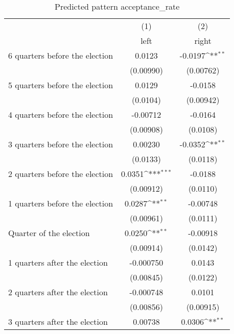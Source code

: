 \begin{table}[htbp]\centering
\def\sym#1{\ifmmode^{#1}\else\(^{#1}\)\fi}
\caption{Predicted pattern acceptance\_rate}
\begin{tabular}{l*{2}{c}}
\hline\hline
                    &\multicolumn{1}{c}{(1)}&\multicolumn{1}{c}{(2)}\\
                    &\multicolumn{1}{c}{left}&\multicolumn{1}{c}{right}\\
\hline
 6 quarters before the election&      0.0123         &     -0.0197\sym{**} \\
                    &   (0.00990)         &   (0.00762)         \\
[1em]
 5 quarters before the election&      0.0129         &     -0.0158         \\
                    &    (0.0104)         &   (0.00942)         \\
[1em]
 4 quarters before the election&    -0.00712         &     -0.0164         \\
                    &   (0.00908)         &    (0.0108)         \\
[1em]
 3 quarters before the election&     0.00230         &     -0.0352\sym{**} \\
                    &    (0.0133)         &    (0.0118)         \\
[1em]
 2 quarters before the election&      0.0351\sym{***}&     -0.0188         \\
                    &   (0.00912)         &    (0.0110)         \\
[1em]
 1 quarters before the election&      0.0287\sym{**} &    -0.00748         \\
                    &   (0.00961)         &    (0.0111)         \\
[1em]
Quarter of the election&      0.0250\sym{**} &    -0.00918         \\
                    &   (0.00914)         &    (0.0142)         \\
[1em]
 1 quarters after the election&   -0.000750         &      0.0143         \\
                    &   (0.00845)         &    (0.0122)         \\
[1em]
 2 quarters after the election&   -0.000748         &      0.0101         \\
                    &   (0.00856)         &   (0.00915)         \\
[1em]
 3 quarters after the election&     0.00738         &      0.0306\sym{**} \\

\end{tabular}
\end{table}
